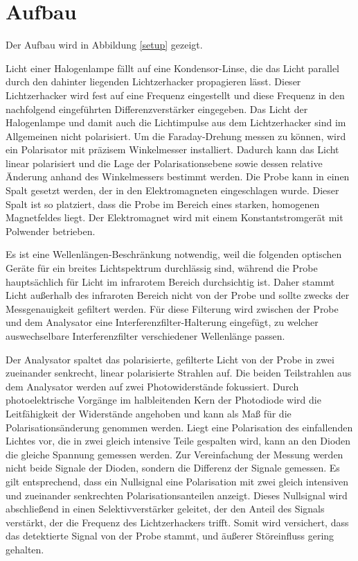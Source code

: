 \section{Aufbau}
\label{sec:Aufbau}
Der Aufbau wird in Abbildung \ref{setup} gezeigt.

Licht einer Halogenlampe fällt auf eine Kondensor-Linse, die das Licht parallel durch den dahinter liegenden Lichtzerhacker propagieren lässt.
Dieser Lichtzerhacker wird fest auf eine Frequenz eingestellt und diese Frequenz in den nachfolgend eingeführten Differenzverstärker eingegeben.
Das Licht der Halogenlampe und damit auch die Lichtimpulse aus dem Lichtzerhacker sind im Allgemeinen nicht polarisiert.
Um die Faraday-Drehung messen zu können, wird ein Polarisator mit präzisem Winkelmesser installiert. Dadurch kann das Licht linear polarisiert und die Lage der Polarisationsebene sowie dessen relative Änderung anhand des Winkelmessers bestimmt werden.
Die Probe kann in einen Spalt gesetzt werden, der in den Elektromagneten eingeschlagen wurde. Dieser Spalt ist so platziert, dass die Probe im Bereich eines starken, homogenen Magnetfeldes liegt. Der Elektromagnet wird mit einem Konstantstromgerät mit Polwender betrieben.

Es ist eine Wellenlängen-Beschränkung notwendig, weil die folgenden optischen Geräte für ein breites Lichtspektrum durchlässig sind,
während die Probe hauptsächlich für Licht im infrarotem Bereich durchsichtig ist.
Daher stammt Licht außerhalb des infraroten Bereich nicht von der Probe und sollte zwecks der Messgenauigkeit gefiltert werden.
Für diese Filterung wird zwischen der Probe und dem Analysator eine Interferenzfilter-Halterung eingefügt, zu welcher auswechselbare Interferenzfilter verschiedener Wellenlänge
passen.

Der Analysator spaltet das polarisierte, gefilterte Licht von der Probe in zwei zueinander senkrecht, linear polarisierte Strahlen auf.
Die beiden Teilstrahlen aus dem Analysator werden auf zwei Photowiderstände fokussiert.
Durch photoelektrische Vorgänge im halbleitenden Kern der Photodiode wird die Leitfähigkeit der Widerstände angehoben und
kann als Maß für die Polarisationsänderung genommen werden.
Liegt eine Polarisation des einfallenden Lichtes vor, die in zwei gleich intensive Teile gespalten wird,
kann an den Dioden die gleiche Spannung gemessen werden.
Zur Vereinfachung der Messung werden nicht beide Signale der Dioden, sondern die Differenz der Signale gemessen.
Es gilt entsprechend, dass ein Nullsignal eine Polarisation mit zwei gleich intensiven und zueinander senkrechten Polarisationsanteilen anzeigt.
Dieses Nullsignal wird abschließend in einen Selektivverstärker geleitet, der den Anteil des Signals verstärkt, der die Frequenz des Lichtzerhackers trifft. Somit wird versichert, dass das detektierte Signal von der Probe stammt, und äußerer Störeinfluss gering gehalten.


